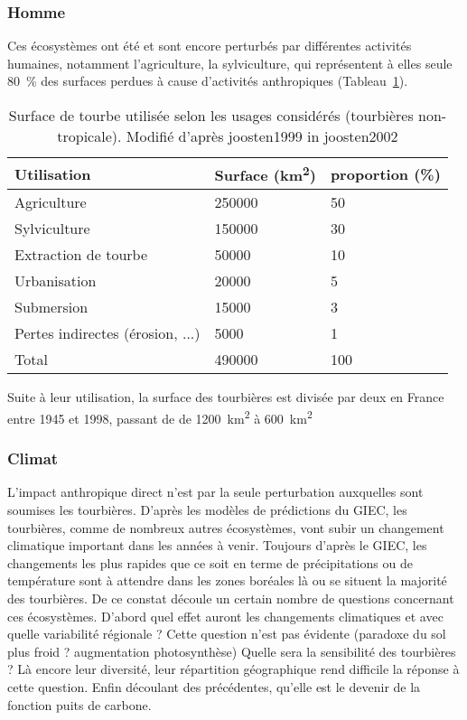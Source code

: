 \subsubsection{Homme}
Ces écosystèmes ont été et sont encore perturbés par différentes activités humaines, notamment l'agriculture, la sylviculture, qui représentent à elles seule \SI{80}{\percent} des surfaces perdues à cause d'activités anthropiques (Tableau~\ref{table:tourbeUsage}). 
\begin{table}[!h]
\centering
\caption{Surface de tourbe utilisée selon les usages considérés (tourbières non-tropicale). Modifié d'après joosten1999 in joosten2002}
\label{table:tourbeUsage}
\begin{tabular}{lll}\toprule
Utilisation & Surface (\si{\square\kilo\meter})  & proportion (\%) \\ \midrule
Agriculture & \num{250000} & \num{50} \\ 
Sylviculture & \num{150000} & \num{30}\\ 
Extraction de tourbe & \num{50000} & \num{10}\\ 
Urbanisation & \num{20000} & \num{5}\\ 
Submersion & \num{15000} & \num{3}\\ 
Pertes indirectes (érosion, ...) & \num{5000} & \num{1}\\[1ex]
Total & \num{490000} & \num{100}\\
\bottomrule
\end{tabular}
\end{table}

Suite à leur utilisation, la surface des tourbières est divisée par deux en France entre 1945 et 1998, passant de de \SI{1200}{\square\kilo\meter} à \SI{600}{\square\kilo\meter} \cite{manneville1999}

\subsubsection{Climat}
L'impact anthropique direct n'est par la seule perturbation auxquelles sont soumises les tourbières.
D'après les modèles de prédictions du GIEC, les tourbières, comme de nombreux autres écosystèmes, vont subir un changement climatique important dans les années à venir.
Toujours d'après le GIEC, les changements les plus rapides que ce soit en terme de précipitations ou de température sont à attendre dans les zones boréales là ou se situent la majorité des tourbières.
De ce constat découle un certain nombre de questions concernant ces écosystèmes.
D'abord quel effet auront les changements climatiques et avec quelle variabilité régionale ?
Cette question n'est pas évidente (paradoxe du sol plus froid ? augmentation photosynthèse)
Quelle sera la sensibilité des tourbières ?
Là encore leur diversité, leur répartition géographique rend difficile la réponse à cette question.
Enfin découlant des précédentes, qu'elle est le devenir de la fonction puits de carbone.

